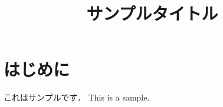 \documentclass[submit,techrep,noauthor]{ipsj}
\begin{document}
\title{サンプルタイトル}

\maketitle

\section{はじめに}
これはサンプルです．
This is a sample.
\end{document}
